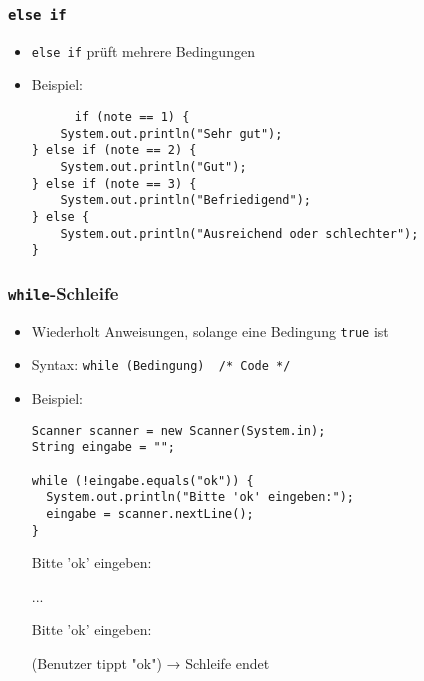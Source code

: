 \documentclass{../../presentation}
\begin{document}
\begin{frame}[fragile]
  \frametitle{\texttt{else if}}
  \begin{itemize}
    \item \texttt{else if} prüft mehrere Bedingungen
    \item Beispiel:
    \begin{verbatim}
      if (note == 1) {
    System.out.println("Sehr gut");
} else if (note == 2) {
    System.out.println("Gut");
} else if (note == 3) {
    System.out.println("Befriedigend");
} else {
    System.out.println("Ausreichend oder schlechter");
} 
    \end{verbatim}
  \end{itemize}
\end{frame}




\begin{frame}[fragile]
  \frametitle{\texttt{while}-Schleife}

  \begin{itemize}
    \item<1-> Wiederholt Anweisungen, solange eine Bedingung \texttt{true} ist    
    \item<1-> Syntax: \texttt{while (Bedingung) { /* Code */ }}
    \item<2-> Beispiel:
      \begin{verbatim}
Scanner scanner = new Scanner(System.in);
String eingabe = "";

while (!eingabe.equals("ok")) {
  System.out.println("Bitte 'ok' eingeben:");
  eingabe = scanner.nextLine();
}
      \end{verbatim}
      
      \begin{ausgabe}
Bitte 'ok' eingeben:

...

Bitte 'ok' eingeben:

(Benutzer tippt "ok") → Schleife endet

      \end{ausgabe}
    
      \end{itemize}

\end{frame}
\end{document}
